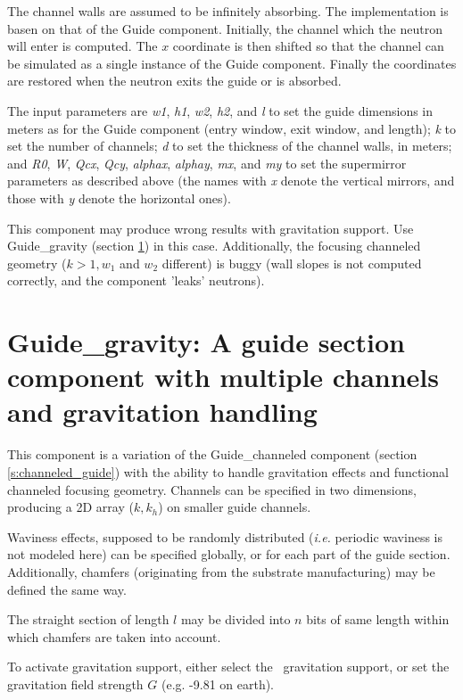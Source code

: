 The channel walls are assumed to be infinitely absorbing. The
implementation is basen on that of the Guide component. Initially, the
channel which the neutron will enter is computed. The $x$ coordinate is
then shifted so that the channel can be simulated as a single instance
of the Guide component. Finally the coordinates are restored when the
neutron exits the guide or is absorbed.

The input parameters are \textit{w1}, \textit{h1}, \textit{w2},
\textit{h2}, and \textit{l} to set the guide dimensions in meters as for
the Guide component (entry window, exit window, and length); \textit{k}
to set the number of channels; \textit{d} to set the thickness of the
channel walls, in meters; and \textit{R0}, \textit{W}, \textit{Qcx},
\textit{Qcy}, \textit{alphax}, \textit{alphay}, \textit{mx}, and \textit{my} to
set the supermirror parameters as described above (the names with \textit{x}
denote the vertical mirrors, and those with \textit{y} denote the horizontal
ones).

This component may produce wrong results with gravitation support. Use Guide\_gravity (section \ref{s:guide_gravity}) in this case. Additionally, the focusing channeled geometry ($k > 1, w_1$ and $w_2$ different) is buggy (wall slopes is not computed correctly, and the component 'leaks' neutrons).


\section{Guide\_gravity: A guide section component with multiple channels and gravitation handling}
\label{s:guide_gravity}


This component is a variation of the Guide\_channeled component (section \ref{s:channeled_guide}) with the ability to handle gravitation effects and functional channeled focusing geometry. Channels can be specified in two dimensions, producing a 2D array ($k, k_h$) on smaller guide channels.

Waviness effects, supposed to be randomly distributed (\emph{i.e.} periodic waviness is not modeled here) can be specified globally, or for each part of the guide section. Additionally, chamfers (originating from the substrate manufacturing) may be defined the same way.

The straight section of length $l$ may be divided into $n$ bits of same length within which chamfers are taken into account.

To activate gravitation support, either select the \MCS\ gravitation support, or set the gravitation field strength $G$ (e.g. -9.81 on earth).

